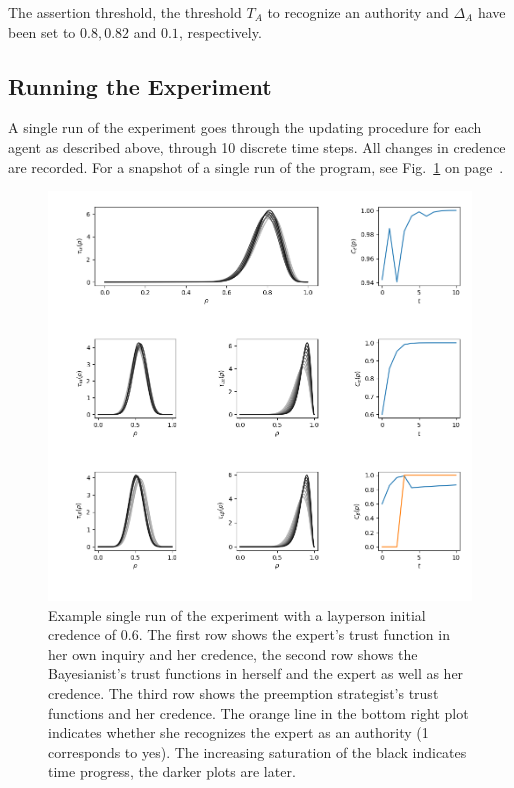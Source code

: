 \documentclass[11pt, a4paper]{scrartcl}
\begin{document}
The assertion threshold, the threshold $T_A$ to recognize an authority and $\Delta_A$ have been set to $0.8, 0.82$ and $0.1$, respectively.

\subsection{Running the Experiment}

A single run of the experiment goes through the updating procedure for each agent as described above, through 10 discrete time steps. All changes in credence are recorded. For a snapshot of a single run of the program, see Fig.~\ref{fig:run} on page~\pageref{fig:run}.

\begin{figure}
	\centering
\includegraphics[width=\textwidth]{Run.png}
\caption{Example single run of the experiment with a layperson initial credence of $0.6$. The first row shows the expert's trust function in her own inquiry and her credence, the second row shows the Bayesianist's trust functions in herself and the expert as well as her credence. The third row shows the preemption strategist's trust functions and her credence. The orange line in the bottom right plot indicates whether she recognizes the expert as an authority (1 corresponds to yes). The increasing saturation of the black indicates time progress, the darker plots are later.\label{fig:run}}
\end{figure}
\end{document}

